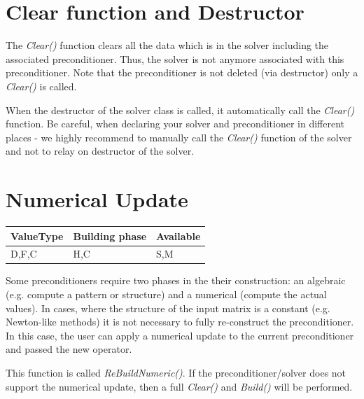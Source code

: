 



\section{Clear function and Destructor}

The \emph{Clear()} function clears all the data which is in the solver including the associated preconditioner. Thus, the solver is not anymore associated with this preconditioner. Note that the preconditioner is not deleted (via destructor) only a \emph{Clear()} is called.

When the destructor of the solver class is called, it automatically call the \emph{Clear()} function. Be careful, when declaring your solver and preconditioner in different places - we highly recommend to manually call the \emph{Clear()} function of the solver and not to relay on destructor of the solver.

\section{Numerical Update}

\begin{table}[H]
\begin{tabular}{l|l|l}
\multicolumn{1}{c|}{ValueType} & Building phase & Available \\ \hline
D,F,C                          & H,C            & S,M      
\end{tabular}
\end{table}

Some preconditioners require two phases in the their construction: an algebraic (e.g. compute a pattern or structure) and a numerical (compute the actual values). In cases, where the structure of the input matrix is a constant (e.g. Newton-like methods) it is not necessary to fully re-construct the preconditioner. In this case, the user can apply a numerical update to the current preconditioner and passed the new operator. 

This function is called \emph{ReBuildNumeric()}. If the preconditioner/solver does not support the numerical update, then a full \emph{Clear()} and \emph{Build()} will be performed.

